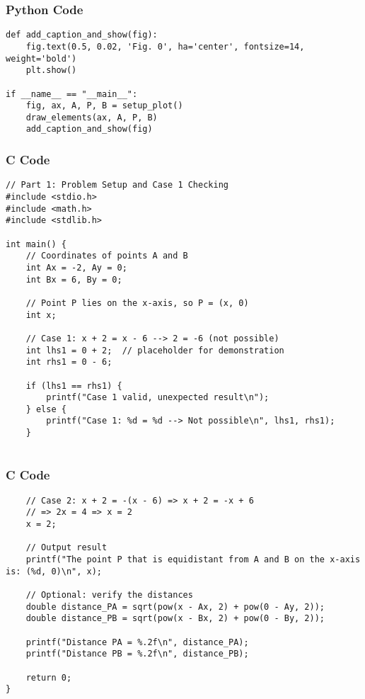 \documentclass{beamer}
\begin{document}
\begin{frame}[fragile]
    \frametitle{Python Code}
      \begin{lstlisting}
def add_caption_and_show(fig):
    fig.text(0.5, 0.02, 'Fig. 0', ha='center', fontsize=14, weight='bold')
    plt.show()

if __name__ == "__main__":
    fig, ax, A, P, B = setup_plot()
    draw_elements(ax, A, P, B)
    add_caption_and_show(fig)
\end{lstlisting}
\end{frame}

\begin{frame}[fragile]
\frametitle{C Code}
\begin{lstlisting}
// Part 1: Problem Setup and Case 1 Checking
#include <stdio.h>
#include <math.h>
#include <stdlib.h>

int main() {
    // Coordinates of points A and B
    int Ax = -2, Ay = 0;
    int Bx = 6, By = 0;

    // Point P lies on the x-axis, so P = (x, 0)
    int x;

    // Case 1: x + 2 = x - 6 --> 2 = -6 (not possible)
    int lhs1 = 0 + 2;  // placeholder for demonstration
    int rhs1 = 0 - 6;

    if (lhs1 == rhs1) {
        printf("Case 1 valid, unexpected result\n");
    } else {
        printf("Case 1: %d = %d --> Not possible\n", lhs1, rhs1);
    }


\end{lstlisting}

\end{frame}

\begin{frame}[fragile]
\frametitle{C Code}
\begin{lstlisting}
    // Case 2: x + 2 = -(x - 6) => x + 2 = -x + 6
    // => 2x = 4 => x = 2
    x = 2;

    // Output result
    printf("The point P that is equidistant from A and B on the x-axis is: (%d, 0)\n", x);

    // Optional: verify the distances
    double distance_PA = sqrt(pow(x - Ax, 2) + pow(0 - Ay, 2));
    double distance_PB = sqrt(pow(x - Bx, 2) + pow(0 - By, 2));

    printf("Distance PA = %.2f\n", distance_PA);
    printf("Distance PB = %.2f\n", distance_PB);

    return 0;
}

\end{lstlisting}

\end{frame}
\end{document}
